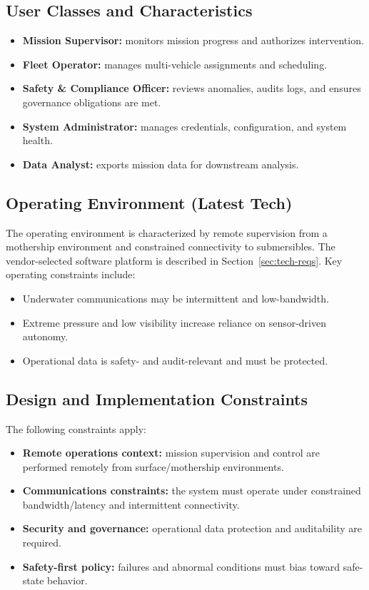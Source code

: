 \documentclass[11pt,a4paper]{article}
\let\origref\ref
\renewcommand{\ref}[1]{\uline{\origref{#1}}}%
\begin{document}
\subsection{User Classes and Characteristics}
\begin{itemize}[leftmargin=*,nosep]
  \item \textbf{Mission Supervisor:} monitors mission progress and authorizes intervention.
  \item \textbf{Fleet Operator:} manages multi-vehicle assignments and scheduling.
  \item \textbf{Safety \& Compliance Officer:} reviews anomalies, audits logs, and ensures governance obligations are met.
  \item \textbf{System Administrator:} manages credentials, configuration, and system health.
  \item \textbf{Data Analyst:} exports mission data for downstream analysis.
\end{itemize}

\subsection{Operating Environment (Latest Tech)}
The operating environment is characterized by remote supervision from a mothership environment and constrained connectivity to submersibles. The vendor-selected software platform is described in Section~\ref{sec:tech-reqs}. Key operating constraints include:
\begin{itemize}[leftmargin=*,nosep]
  \item Underwater communications may be intermittent and low-bandwidth.
  \item Extreme pressure and low visibility increase reliance on sensor-driven autonomy.
  \item Operational data is safety- and audit-relevant and must be protected.
\end{itemize}

\subsection{Design and Implementation Constraints}
The following constraints apply:
\begin{itemize}[leftmargin=*,nosep]
  \item \textbf{Remote operations context:} mission supervision and control are performed remotely from surface/mothership environments.
  \item \textbf{Communications constraints:} the system must operate under constrained bandwidth/latency and intermittent connectivity.
  \item \textbf{Security and governance:} operational data protection and auditability are required.
  \item \textbf{Safety-first policy:} failures and abnormal conditions must bias toward safe-state behavior.
\end{itemize}
\end{document}
